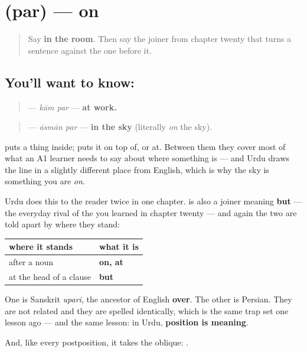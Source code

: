 \section[\texorpdfstring{\ur{پر} (par)}{پر (par)}]{ (par) — on}

\label{lesson:UR-C23-par}



\begin{quote}
Say \textbf{in the room}. Then say the joiner from chapter twenty that turns a sentence against the one before it.
\end{quote}

\subsection*{You'll want to know: }
\begin{quote}
\textbf{ } — \emph{kām par} — \textbf{at work.}
\end{quote}

\begin{quote}
\textbf{ } — \emph{āsmān par} — \textbf{in the sky} (literally \emph{on} the sky).
\end{quote}

\textbf{} puts a thing inside; \textbf{} puts it on top of, or at. Between them they cover most of what an A1 learner needs to say about where something is — and Urdu draws the line in a slightly different place from English, which is why the sky is something you are \emph{on}.

\begin{grammarlens}[title={Grammar Lens: and a second \ur{پر}, which is not this one}]
Urdu does this to the reader twice in one chapter. \textbf{} is also a joiner meaning \textbf{but} — the everyday rival of the \textbf{} you learned in chapter twenty — and again the two are told apart by where they stand:

\noindent
\begin{tabularx}{\linewidth}{@{}>{\raggedright\arraybackslash}X>{\raggedright\arraybackslash}X@{}}
\toprule
\textbf{where it stands} & \textbf{what it is} \\
\midrule
after a noun & \textbf{on, at} \\
at the head of a clause & \textbf{but} \\
\bottomrule
\end{tabularx}

One is Sanskrit \emph{upari}, the ancestor of English \textbf{over}. The other is Persian. They are not related and they are spelled identically, which is the same trap \textbf{} set one lesson ago — and the same lesson: in Urdu, \textbf{position is meaning}.

And, like every postposition, it takes the oblique: \textbf{ }.
\end{grammarlens}

